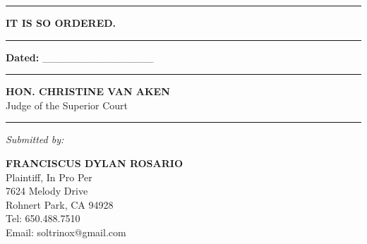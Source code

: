 \begin{center}\rule{0.5\linewidth}{0.5pt}\end{center}

\textbf{IT IS SO ORDERED.}

\begin{center}\rule{0.5\linewidth}{0.5pt}\end{center}

\textbf{Dated:} \_\_\_\_\_\_\_\_\_\_\_\_\_\_\_

\begin{center}\rule{0.5\linewidth}{0.5pt}\end{center}

\textbf{HON. CHRISTINE VAN AKEN}\\
Judge of the Superior Court

\begin{center}\rule{0.5\linewidth}{0.5pt}\end{center}

\emph{Submitted by:}

\textbf{FRANCISCUS DYLAN ROSARIO}\\
Plaintiff, In Pro Per\\
7624 Melody Drive\\
Rohnert Park, CA 94928\\
Tel: 650.488.7510\\
Email: soltrinox@gmail.com


